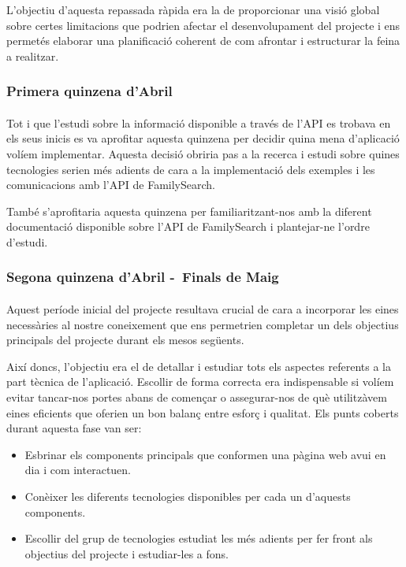             L'objectiu d'aquesta repassada ràpida era la de proporcionar una visió global sobre certes limitacions que podrien afectar el desenvolupament del projecte i ens permetés elaborar una planificació coherent de com afrontar i estructurar la feina a realitzar.

        \subsubsection{Primera quinzena d'Abril}

            \paragraph{}
            Tot i que l’estudi sobre la informació disponible a través de l'\gls{API} es trobava en els seus inicis es va aprofitar aquesta quinzena per decidir quina mena d’aplicació volíem implementar. Aquesta decisió obriria pas a la recerca i estudi sobre quines tecnologies serien més adients de cara a la implementació dels exemples i les comunicacions amb l'\gls{API} de FamilySearch.

            També s'aprofitaria aquesta quinzena per familiaritzant-nos amb la diferent documentació disponible sobre l'\gls{API} de FamilySearch i plantejar-ne l’ordre d'estudi.

        \subsubsection{Segona quinzena d'Abril -\ Finals de Maig}

            \paragraph{}
            Aquest període inicial del projecte resultava crucial de cara a incorporar les eines necessàries al nostre coneixement que ens permetrien completar un dels objectius principals del projecte durant els mesos següents.

            Així doncs, l'objectiu era el de detallar i estudiar tots els aspectes referents a la part tècnica de l’aplicació. Escollir de forma correcta era indispensable si volíem evitar tancar-nos portes abans de començar o assegurar-nos de què utilitzàvem eines eficients que oferien un bon balanç entre esforç i qualitat.  Els punts coberts durant aquesta fase van ser:

            \begin{itemize}
                \item Esbrinar els components principals que conformen una pàgina web avui en dia i com interactuen.
                \item Conèixer les diferents tecnologies disponibles per cada un d’aquests components.
                \item Escollir del grup de tecnologies estudiat les més adients per fer front als objectius del projecte i estudiar-les a fons.
            \end{itemize}

